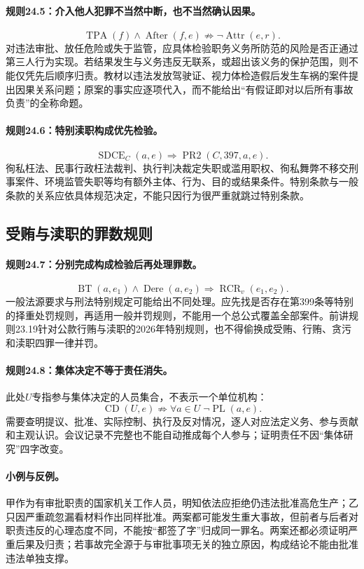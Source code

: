 \paragraph{规则24.5：介入他人犯罪不当然中断，也不当然确认因果。}
\[
\operatorname{TPA}(f)\land\operatorname{After}(f,e)
\nRightarrow\neg\operatorname{Attr}(e,r).
\]
对违法审批、放任危险或失于监管，应具体检验职务义务所防范的风险是否正通过第三人行为实现。若结果发生与义务违反无联系，或超出该义务的保护范围，则不能仅凭先后顺序归责。教材以违法发放驾驶证、视力体检造假后发生车祸的案件提出因果关系问题；原案的事实应逐项代入，而不能给出“有假证即对以后所有事故负责”的全称命题。

\paragraph{规则24.6：特别渎职构成优先检验。}
\[
\operatorname{SDCE}_{C}(a,e)
\Rightarrow\operatorname{PR2}(C,397,a,e).
\]
徇私枉法、民事行政枉法裁判、执行判决裁定失职或滥用职权、徇私舞弊不移交刑事案件、环境监管失职等均有额外主体、行为、目的或结果条件。特别条款与一般条款的关系应依具体规范决定，不能只因行为很严重就跳过特别条款。

\subsection{受贿与渎职的罪数规则}
\paragraph{规则24.7：分别完成构成检验后再处理罪数。}
\[
\operatorname{BT}(a,e_1)\land\operatorname{Dere}(a,e_2)
\Rightarrow\operatorname{RCR}_v(e_1,e_2).
\]
一般法源要求与刑法特别规定可能给出不同处理。应先找是否存在第399条等特别的择重处罚规则，再适用一般并罚规则，不能用一个总公式覆盖全部案件。前讲规则23.19针对公款行贿与渎职的2026年特别规则，也不得偷换成受贿、行贿、贪污和渎职四罪一律并罚。

\paragraph{规则24.8：集体决定不等于责任消失。}
此处$U$专指参与集体决定的人员集合，不表示一个单位机构：
\[
\operatorname{CD}(U,e)
\nRightarrow\forall a\in U\;\neg\operatorname{PL}(a,e).
\]
需要查明提议、批准、实际控制、执行及反对情况，逐人对应法定义务、参与贡献和主观认识。会议记录不完整也不能自动推成每个人参与；证明责任不因“集体研究”四字改变。

\paragraph{小例与反例。}
甲作为有审批职责的国家机关工作人员，明知依法应拒绝仍违法批准高危生产；乙只因严重疏忽漏看材料作出同样批准。两案都可能发生重大事故，但前者与后者对职责违反的心理态度不同，不能按“都签了字”归成同一罪名。两案还都必须证明严重后果及归责；若事故完全源于与审批事项无关的独立原因，构成结论不能由批准违法单独支撑。

